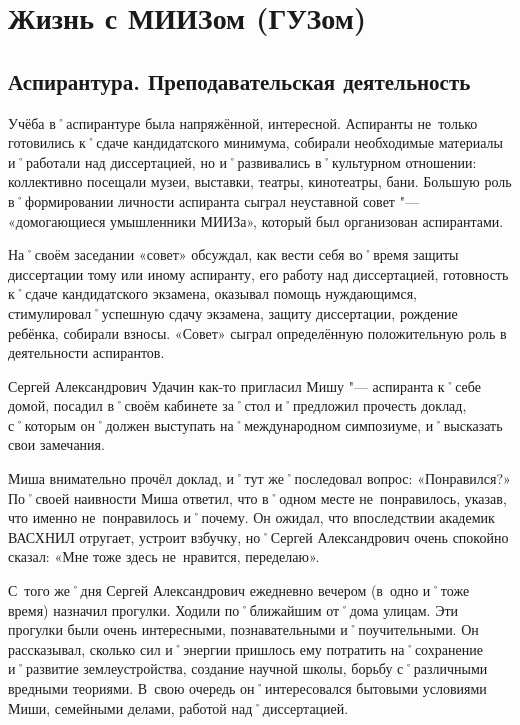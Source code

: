 ﻿\chapter{Жизнь с МИИЗом (ГУЗом)}

\section*{Аспирантура. Преподавательская деятельность}
\label{sec:aspirantura}

Учёба в˚аспирантуре была напряжённой, интересной. Аспиранты не~только готовились к˚сдаче кандидатского минимума, собирали необходимые материалы и˚работали над диссертацией, но и˚развивались в˚культурном отношении: коллективно посещали музеи, выставки, театры, кинотеатры, бани. Большую роль в˚формировании личности аспиранта сыграл неуставной совет "--- «домогающиеся умышленники МИИЗа», который был организован аспирантами. 

На˚своём заседании «совет» обсуждал, как вести себя во˚время защиты диссертации тому или иному аспиранту, его работу над диссертацией, готовность к˚сдаче кандидатского экзамена, оказывал помощь нуждающимся, стимулировал˚успешную сдачу экзамена, защиту диссертации, рождение ребёнка, собирали взносы. «Совет» сыграл определённую положительную роль в деятельности аспирантов. 	

Сергей Александрович Удачин как-то пригласил Мишу "--- аспиранта к˚себе домой, посадил в˚своём кабинете за˚стол и˚предложил прочесть доклад, с˚которым он˚должен выступать на˚международном симпозиуме, и˚высказать свои замечания.

Миша внимательно прочёл доклад, и˚тут же˚последовал вопрос: «Понравился?» По˚своей наивности Миша ответил, что в˚одном месте не~понравилось, указав, что именно не~понравилось и˚почему. Он ожидал, что впоследствии академик ВАСХНИЛ отругает, устроит взбучку, но˚Сергей Александрович очень спокойно сказал: «Мне тоже здесь не~нравится, переделаю».

С~того же˚дня Сергей Александрович ежедневно вечером (в~одно и˚тоже время) назначил прогулки. Ходили по˚ближайшим от˚дома улицам. Эти прогулки были очень интересными, познавательными и˚поучительными. Он рассказывал, сколько сил и˚энергии пришлось ему потратить на˚сохранение и˚развитие землеустройства, создание научной школы, борьбу с˚различными вредными теориями. В~свою очередь он˚интересовался бытовыми условиями Миши, семейными делами, работой над˚диссертацией.

